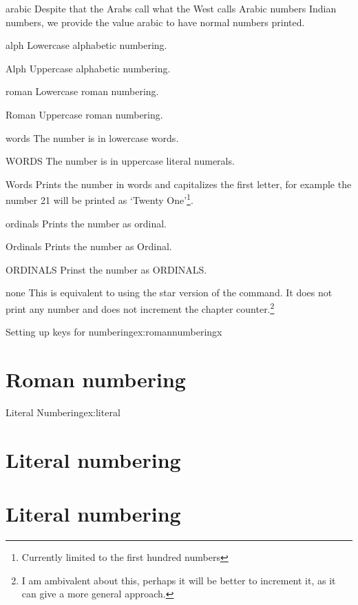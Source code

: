 \begin{marglist}
\item [arabic] Despite that the Arabs call what the West calls Arabic numbers Indian numbers, we provide the value arabic to have normal numbers printed.
\item [alph] Lowercase alphabetic numbering.
\item [Alph] Uppercase alphabetic numbering.
\item [roman] Lowercase roman numbering.
\item [Roman] Uppercase roman numbering.
\item [words] The number is in lowercase words.
\item [WORDS] The number is in uppercase literal numerals.
\item [Words] Prints the number in words and capitalizes the first letter, for example the number 21 will be printed as `Twenty One'\footnote{Currently limited to the first hundred numbers}.
\item [ordinals] Prints the number as ordinal.
\item [Ordinals] Prints the number as Ordinal.
\item [ORDINALS] Prinst the number as ORDINALS.
\item [none] This is equivalent to using the star version of the command. It does not print any number and does not increment the chapter counter.\footnote{I am ambivalent about this, perhaps it will be better to increment it, as it can give a more general approach.}
\end{marglist}


\begin{texexample}{Setting up keys for numbering}{ex:romannumberingx}
\bgroup
{}
\chapter{Roman numbering}
\lorem
\egroup
\end{texexample}




\begin{texexample}{Literal Numbering}{ex:literal}
\chapter{Literal numbering}
\lorem
{}
\chapter{Literal numbering} 
\lorem
\end{texexample}

